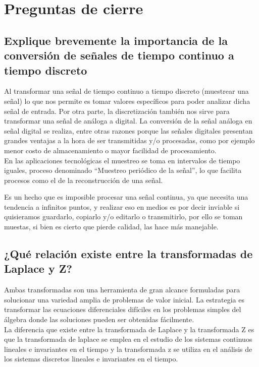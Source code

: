 \justifying
\section{Preguntas de cierre}

\subsection{Explique brevemente la importancia de la conversión de señales de tiempo continuo a tiempo discreto}

Al transformar una señal de tiempo continuo a tiempo discreto (muestrear una señal) lo que nos permite es tomar valores específicos para poder analizar dicha señal de entrada. Por otra parte, la discretización también nos sirve para transformar una señal de análoga a digital. La conversión de la señal análoga en señal digital se realiza, entre otras razones porque las señales digitales presentan grandes ventajas a la hora de ser transmitidas y/o procesadas, como por ejemplo menor costo de almacenamiento o mayor facilidad de procesamiento.\\
En las aplicaciones tecnológicas el muestreo se toma en intervalos de tiempo iguales, proceso denominado “Muestreo periódico de la señal”, lo que facilita procesos como el de la reconstrucción de una señal.

Es un hecho que es imposible procesar una señal continua, ya que necesita una tendencia a infinitos puntos, y realizar eso en medios es por decir inviable si quisieramos guardarlo, copiarlo y/o editarlo o transmitirlo, por ello se toman muestas, si bien es cierto que pierde calidad, las hace más manejable.


\subsection{¿Qué relación existe entre la transformadas de Laplace y Z?}
Ambas transformadas son una herramienta de gran alcance formuladas para solucionar una variedad amplia de problemas de valor inicial. La estrategia es transformar las ecuaciones diferenciales difíciles en los problemas simples del álgebra donde las soluciones pueden ser obtenidas fácilmente.\\
La diferencia que existe entre la transformada de Laplace y la transformada Z es que la transformada de laplace se emplea en el estudio de los sistemas continuos lineales e invariantes en el tiempo y la transformada z se utiliza en el análisis de los sistemas discretos lineales e invariantes en el tiempo.


